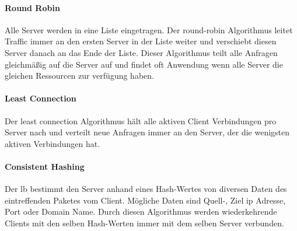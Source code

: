 \paragraph{Round Robin}
Alle Server werden in eine Liste eingetragen. Der round-robin Algorithmus leitet Traffic immer an den ersten Server in der Liste weiter und verschiebt diesen Server danach an das Ende der Liste.
Dieser Algorithmus teilt alle Anfragen gleichmä{\ss}ig auf die Server auf und findet oft Anwendung wenn alle Server die gleichen Ressourcen zur verfügung haben.
\cite{WhatLoadBalancer}

\paragraph{Least Connection}
Der least connection Algorithmus hält alle aktiven Client Verbindungen pro Server nach und verteilt neue Anfragen immer an den Server, der die wenigsten aktiven Verbindungen hat.
\cite{WhatLoadBalancer}

\paragraph{Consistent Hashing}
Der \ac{lb} bestimmt den Server anhand eines Hash-Wertes von diversen Daten des eintreffenden Paketes vom Client.
Mögliche Daten sind Quell-, Ziel \ac{ip} Adresse, Port oder Domain Name. Durch diesen Algorithmus werden wiederkehrende Clients mit den selben Hash-Werten immer mit dem selben Server verbunden.
\cite{WhatLoadBalancer}

